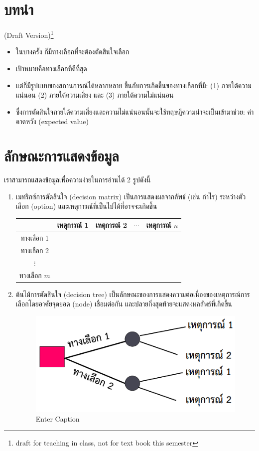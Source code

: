 \section*{บทนำ}
(Draft Version)\footnote{draft for teaching in class, not for text book this semester}

\begin{itemize}
    \item ในบางครั้ง ก็มีทางเลือกที่จะต้องตัดสินใจเลือก
    \item เป้าหมายคือทางเลือกที่ดีที่สุด
    \item แต่ก็มีรูปแบบของสถานการณ์ได้หลากหลาย ขึ้นกับการเกิดขึ้นของทางเลือกที่มี: (1) ภายใต้ความแน่นอน (2) ภายใต้ความเสี่ยง และ (3) ภายใต้ความไม่แน่นอน
    \item ซึ่งการตัดสินใจภายใต้ความเสี่ยงและความไม่แน่นอนนั้นจะใช้ทฤษฎีความน่าจะเป็นเข้ามาช่วย: ค่าคาดหวัง (expected value)
\end{itemize}

\section{ลักษณะการแสดงข้อมูล}
เราสามารถแสดงข้อมูลเพื่อความง่ายในการอ่านได้ 2 รูปดังนี้
\begin{enumerate}
    \item เมทริกซ์การตัดสินใจ (decision matrix) เป็นการแสดงผลจากลัพธ์ (เช่น กำไร) ระหว่างตัวเลือก (option) และเหตุการณ์ที่เป็นไปได้ที่อาจจะเกิดขึ้น
    \begin{center}
        \begin{tabular}{c|c|c|c|c|}
             & เหตุการณ์ 1 & เหตุการณ์ 2 & $\cdots$ & เหตุการณ์ $n$ \\ \hline
            ทางเลือก 1 &  & & & \\
            ทางเลือก 2 &  & & & \\
            $\vdots$ &  & & & \\
            ทางเลือก $m$ &  & & & \\ \hline
        \end{tabular}
    \end{center}
        
    \item ต้นไม้การตัดสินใจ (decision tree) เป็นลักษณะของการแสดงความต่อเนื่องของเหตุการณ์การเลือกโดยอาศัยจุดยอด (node) เชื่อมต่อกัน และปลายกิ่งสุดท้ายจะแสดงผลลัพธ์ที่เกิดขึ้น
    \begin{figure}[h!]
        \centering
        \includegraphics[width=0.5\linewidth]{decisiontree.png}
        \caption{Enter Caption}
        \label{fig:enter-label}
    \end{figure}
\end{enumerate}

